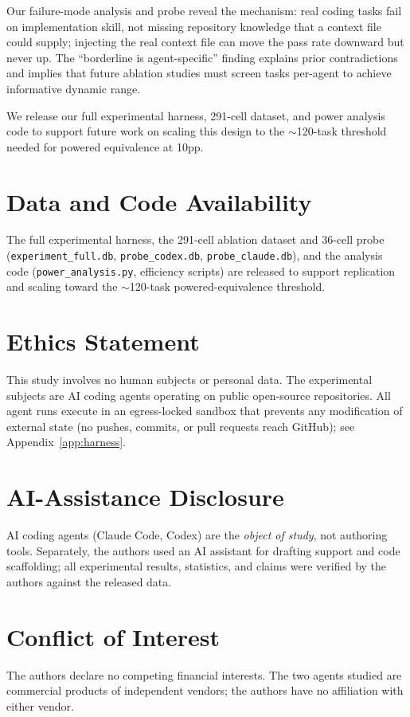 \documentclass[11pt]{article}
\begin{document}
Our failure-mode analysis and probe reveal the mechanism: real coding tasks fail on implementation skill, not missing repository knowledge that a context file could supply; injecting the real context file can move the pass rate downward but never up.
The ``borderline is agent-specific'' finding explains prior contradictions and implies that future ablation studies must screen tasks per-agent to achieve informative dynamic range.

We release our full experimental harness, 291-cell dataset, and power analysis code to support future work on scaling this design to the ${\sim}$120-task threshold needed for powered equivalence at 10pp.

\section*{Data and Code Availability}
The full experimental harness, the 291-cell ablation dataset and 36-cell probe
(\texttt{experiment\_full.db}, \texttt{probe\_codex.db}, \texttt{probe\_claude.db}),
and the analysis code (\texttt{power\_analysis.py}, efficiency scripts) are released
to support replication and scaling toward the ${\sim}$120-task powered-equivalence threshold.

\section*{Ethics Statement}
This study involves no human subjects or personal data. The experimental subjects are
AI coding agents operating on public open-source repositories. All agent runs execute in
an egress-locked sandbox that prevents any modification of external state (no pushes,
commits, or pull requests reach GitHub); see Appendix~\ref{app:harness}.

\section*{AI-Assistance Disclosure}
AI coding agents (Claude Code, Codex) are the \emph{object of study}, not authoring tools.
Separately, the authors used an AI assistant for drafting support and code scaffolding;
all experimental results, statistics, and claims were verified by the authors against the
released data.

\section*{Conflict of Interest}
The authors declare no competing financial interests. The two agents studied are commercial
products of independent vendors; the authors have no affiliation with either vendor.
\end{document}
